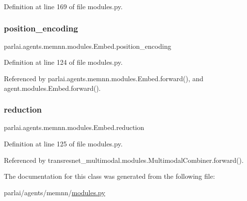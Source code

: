 Definition at line 169 of file modules.\+py.

\mbox{\label{classparlai_1_1agents_1_1memnn_1_1modules_1_1Embed_af0373995dcb0351175527b06b1db8874}} 
\subsubsection{\texorpdfstring{position\+\_\+encoding}{position\_encoding}}
{\footnotesize\ttfamily parlai.\+agents.\+memnn.\+modules.\+Embed.\+position\+\_\+encoding}



Definition at line 124 of file modules.\+py.



Referenced by parlai.\+agents.\+memnn.\+modules.\+Embed.\+forward(), and agent.\+modules.\+Embed.\+forward().

\mbox{\label{classparlai_1_1agents_1_1memnn_1_1modules_1_1Embed_a93010185a49bafacc478d85856d1c95d}} 
\subsubsection{\texorpdfstring{reduction}{reduction}}
{\footnotesize\ttfamily parlai.\+agents.\+memnn.\+modules.\+Embed.\+reduction}



Definition at line 125 of file modules.\+py.



Referenced by transresnet\+\_\+multimodal.\+modules.\+Multimodal\+Combiner.\+forward().



The documentation for this class was generated from the following file\+:\begin{DoxyCompactItemize}
\item 
parlai/agents/memnn/\hyperlink{parlai_2agents_2memnn_2modules_8py}{modules.\+py}\end{DoxyCompactItemize}
